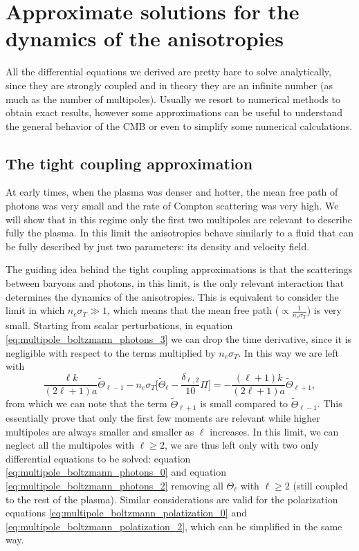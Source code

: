\section{Approximate solutions for the dynamics of the anisotropies}\label{sec:CMBApproximations}
All the differential equations we derived are pretty hare to solve analytically, since they are strongly coupled and in theory they are an infinite number (as much as the number of multipoles). Usually we resort to numerical methods to obtain exact results, however some approximations can be useful to understand the general behavior of the CMB or even to simplify some numerical calculations.
\subsection{The tight coupling approximation}
\label{sec:TightCouplingApproximation}
At early times, when the plasma was denser and hotter, the mean free path of photons was very small and the rate of Compton scattering was very high. We will show that in this regime only the first two multipoles are  relevant to describe fully the plasma. In this limit the anisotropies behave similarly to a fluid that can be fully described by just two parameters: its density and velocity field.

The guiding idea behind the tight coupling approximations is that the scatterings between baryons and photons, in this limit, is the only relevant interaction that determines the dynamics of the anisotropies. This is equivalent to consider the limit in which $n_e\sigma_T\gg1$, which means that the mean free path ($\propto\frac{1}{n_e\sigma_T}$) is very small. Starting from scalar perturbations, in equation \eqref{eq:multipole_boltzmann_photons_3} we can drop the time derivative, since it is negligible with respect to the terms multiplied by $n_e\sigma_T$. In this way we are left with
$$\frac{\ell k}{(2\ell+1)a}\tilde\Theta_{\ell-1}-n_e\sigma_T\bigg[\tilde\Theta_\ell-\frac{\delta_{\ell,2}}{10}\Pi\bigg]=-\frac{(\ell+1)k}{(2\ell+1)a}\tilde\Theta_{\ell+1},$$
from which we can note that the term $\tilde\Theta_{\ell+1}$ is small compared to $\tilde\Theta_{\ell-1}$. This essentially prove that only the first few moments are relevant while higher multipoles are always smaller and smaller as $\ell$ increases. In this limit, we can neglect all the multipoles with $\ell\geq2$, we are thus left only with two only differential equations to be solved: equation \eqref{eq:multipole_boltzmann_photons_0} and equation \eqref{eq:multipole_boltzmann_photons_2} removing all $\Theta_\ell$ with $\ell\geq2$ (still coupled to the rest of the plasma). Similar considerations are valid for the polarization equations \eqref{eq:multipole_boltzmann_polatization_0} and \eqref{eq:multipole_boltzmann_polatization_2}, which can be simplified in the same way.

